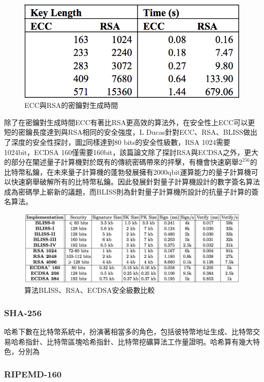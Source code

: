 			\begin{figure}[h]
				\centering
				\includegraphics[width = .5\textwidth]{ECCtime.png}
				\caption{ECC與RSA的密鑰對生成時間\supercite{Performancecomparisonofellipticcurveandrsadigitalsignatures}}\label{ECCtime}
			\end{figure}

			除了在密鑰對生成時間ECC有著比RSA更高效的算法外，在安全性上ECC可以更短的密鑰長度達到與RSA相同的安全強度，L Ducas針對ECC、RSA、BLISS做出了深度的安全性探討\supercite{LatticesignaturesandbimodalGaussians}，圖\ref{LatticesignaturesandbimodalGaussians}同樣達到80 bits的安全性級數，RSA 1024需要1024bit，ECDSA 160僅需要160bit，該篇論文除了探討RSA與ECDSA之外，更大的部分在闡述量子計算機對於既有的傳統密碼帶來的抨擊，有機會快速窮舉$2^{256}$的比特幣私鑰，在未來量子計算機的蓬勃發展擁有2000qbit運算能力的量子計算機可以快速窮舉破解所有的比特幣私鑰。因此發展針對量子計算機設計的數字簽名算法成為密碼學上嶄新的議題，而BLISS則為針對量子計算機所設計的抗量子計算的簽名算法。

			\begin{figure}[h]
				\centering
				\includegraphics[width = 1\textwidth]{LatticesignaturesandbimodalGaussians.png}
				\caption{算法BLISS、RSA、ECDSA安全級數比較\supercite{LatticesignaturesandbimodalGaussians}}\label{LatticesignaturesandbimodalGaussians}
			\end{figure}

			\subsubsection{SHA-256}
			哈希下數在比特幣系統中，扮演著相當多的角色，包括彼特幣地址生成、比特幣交易哈希指針、比特幣區塊哈希指針、比特幣挖礦算法工作量證明。哈希算有幾大特色，分別為
			\subsubsection{RIPEMD-160}
